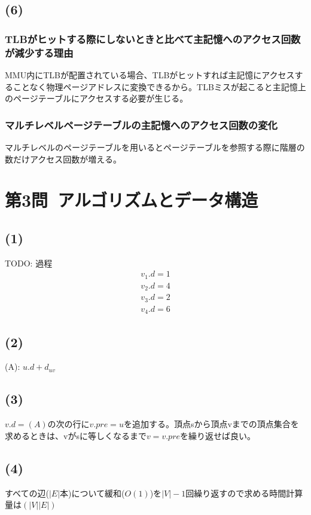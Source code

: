 \documentclass[a4paper,12pt,xelatex,ja=standard]{bxjsarticle}
\begin{document}
\subsection*{(6)}
\subsubsection*{TLBがヒットする際にしないときと比べて主記憶へのアクセス回数が減少する理由}
MMU内にTLBが配置されている場合、TLBがヒットすれば主記憶にアクセスすることなく物理ページアドレスに変換できるから。TLBミスが起こると主記憶上のページテーブルにアクセスする必要が生じる。

\subsubsection*{マルチレベルページテーブルの主記憶へのアクセス回数の変化}
マルチレベルのページテーブルを用いるとページテーブルを参照する際に階層の数だけアクセス回数が増える。

\section*{第3問\ アルゴリズムとデータ構造}
\subsection*{(1)}
TODO: 過程\\
\begin{equation*}
  \begin{split}
    v_1.d = 1 \\
    v_2.d = 4 \\
    v_3.d = 2 \\
    v_4.d = 6
  \end{split}
\end{equation*}

\subsection*{(2)}
(A): $u.d + d_{uv}$

\subsection*{(3)}
$v.d = (A)$の次の行に$v.pre = u$を追加する。頂点sから頂点vまでの頂点集合を求めるときは、vがsに等しくなるまで$v = v.pre$を繰り返せば良い。

\subsection*{(4)}
すべての辺($|E|$本)について緩和($O(1)$)を$|V| - 1$回繰り返すので求める時間計算量は$(|V||E|)$
\end{document}
